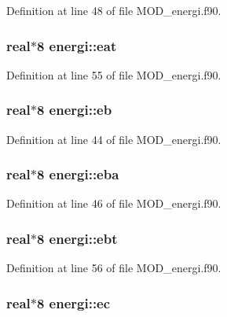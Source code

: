 Definition at line 48 of file M\-O\-D\-\_\-energi.\-f90.

\hypertarget{classenergi_aae8c9f779528371d924cdf39e40e10ea}{
\subsubsection[{eat}]{\setlength{\rightskip}{0pt plus 5cm}real$\ast$8 energi\-::eat}}\label{classenergi_aae8c9f779528371d924cdf39e40e10ea}


Definition at line 55 of file M\-O\-D\-\_\-energi.\-f90.

\hypertarget{classenergi_a806d652013240b5d7e3508ff1a8fd390}{
\subsubsection[{eb}]{\setlength{\rightskip}{0pt plus 5cm}real$\ast$8 energi\-::eb}}\label{classenergi_a806d652013240b5d7e3508ff1a8fd390}


Definition at line 44 of file M\-O\-D\-\_\-energi.\-f90.

\hypertarget{classenergi_a979ef244a80e5198e4de11ff0eef8cf5}{
\subsubsection[{eba}]{\setlength{\rightskip}{0pt plus 5cm}real$\ast$8 energi\-::eba}}\label{classenergi_a979ef244a80e5198e4de11ff0eef8cf5}


Definition at line 46 of file M\-O\-D\-\_\-energi.\-f90.

\hypertarget{classenergi_a2625f637eb404a55f1db3bf7f907b207}{
\subsubsection[{ebt}]{\setlength{\rightskip}{0pt plus 5cm}real$\ast$8 energi\-::ebt}}\label{classenergi_a2625f637eb404a55f1db3bf7f907b207}


Definition at line 56 of file M\-O\-D\-\_\-energi.\-f90.

\hypertarget{classenergi_ae3187fa3ef9fe159f375837345cd3110}{
\subsubsection[{ec}]{\setlength{\rightskip}{0pt plus 5cm}real$\ast$8 energi\-::ec}}\label{classenergi_ae3187fa3ef9fe159f375837345cd3110}


